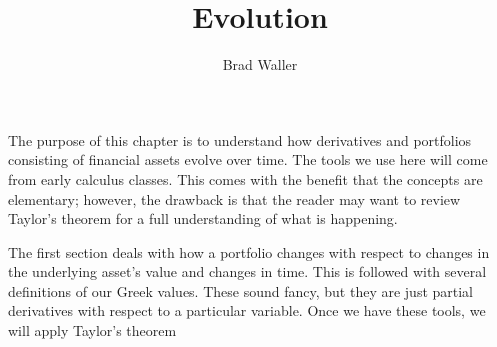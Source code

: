 \documentclass{ximera}
\title{Evolution}
\author{Brad Waller}
\begin{document}
\begin{abstract}
\end{abstract}
\maketitle

The purpose of this chapter is to understand how derivatives and portfolios consisting of financial assets evolve over time. The tools we use here will come from early calculus classes. This comes with the benefit that the concepts are elementary; however, the drawback is that the reader may want to review Taylor's theorem for a full understanding of what is happening. 

The first section deals with how a portfolio changes with respect to changes in the underlying asset's value and changes in time. This is followed with several definitions of our Greek values. These sound fancy, but they are just partial derivatives with respect to a particular variable. Once we have these tools, we will apply Taylor's theorem
\end{document}
